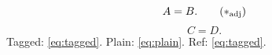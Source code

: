 \documentclass{article}
\begin{document}
\[ A = B. \tag{$\ast_{\mathrm{adj}}$}\label{eq:tagged} \]
\[ C = D. \label{eq:plain} \]
Tagged: \eqref{eq:tagged}. Plain: \eqref{eq:plain}. Ref: \ref{eq:tagged}.
\end{document}
